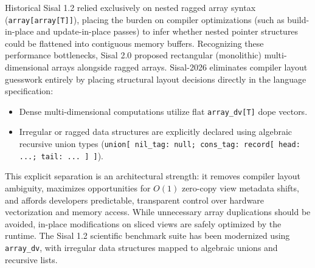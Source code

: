 \begin{note}
Historical Sisal 1.2 relied exclusively on nested ragged array syntax (\texttt{array[array[T]]}), placing the burden on compiler optimizations (such as build-in-place and update-in-place passes) to infer whether nested pointer structures could be flattened into contiguous memory buffers. Recognizing these performance bottlenecks, Sisal 2.0 proposed rectangular (monolithic) multi-dimensional arrays alongside ragged arrays. Sisal-2026 eliminates compiler layout guesswork entirely by placing structural layout decisions directly in the language specification:
\begin{itemize}
    \item Dense multi-dimensional computations utilize flat \texttt{array\_dv[T]} dope vectors.
    \item Irregular or ragged data structures are explicitly declared using algebraic recursive union types (\texttt{union[ nil\_tag: null; cons\_tag: record[ head: ...; tail: ... ] ]}).
\end{itemize}
This explicit separation is an architectural strength: it removes compiler layout ambiguity, maximizes opportunities for $O(1)$ zero-copy view metadata shifts, and affords developers predictable, transparent control over hardware vectorization and memory access. While unnecessary array duplications should be avoided, in-place modifications on sliced views are safely optimized by the runtime. The Sisal 1.2 scientific benchmark suite has been modernized using \texttt{array\_dv}, with irregular data structures mapped to algebraic unions and recursive lists.
\end{note}


